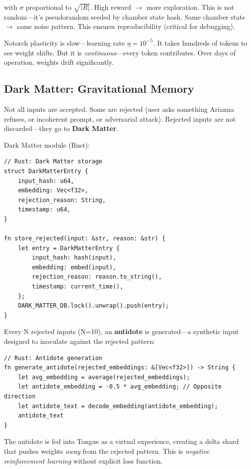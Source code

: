 \documentclass[11pt,a4paper]{article}
\begin{document}
with $\sigma$ proportional to $\sqrt{|R|}$. High reward $\to$ more exploration. This is not random—it's pseudorandom seeded by chamber state hash. Same chamber state $\to$ same noise pattern. This ensures reproducibility (critical for debugging).

Notorch plasticity is slow—learning rate $\eta = 10^{-5}$. It takes hundreds of tokens to see weight shifts. But it is \textit{continuous}—every token contributes. Over days of operation, weights drift significantly.

\subsection{Dark Matter: Gravitational Memory}

Not all inputs are accepted. Some are rejected (user asks something Arianna refuses, or incoherent prompt, or adversarial attack). Rejected inputs are not discarded—they go to \textbf{Dark Matter}.

Dark Matter module (Rust):

\begin{verbatim}
// Rust: Dark Matter storage
struct DarkMatterEntry {
    input_hash: u64,
    embedding: Vec<f32>,
    rejection_reason: String,
    timestamp: u64,
}

fn store_rejected(input: &str, reason: &str) {
    let entry = DarkMatterEntry {
        input_hash: hash(input),
        embedding: embed(input),
        rejection_reason: reason.to_string(),
        timestamp: current_time(),
    };
    DARK_MATTER_DB.lock().unwrap().push(entry);
}
\end{verbatim}

Every N rejected inputs (N=10), an \textbf{antidote} is generated—a synthetic input designed to inoculate against the rejected pattern:

\begin{verbatim}
// Rust: Antidote generation
fn generate_antidote(rejected_embeddings: &[Vec<f32>]) -> String {
    let avg_embedding = average(rejected_embeddings);
    let antidote_embedding = -0.5 * avg_embedding; // Opposite direction
    let antidote_text = decode_embedding(antidote_embedding);
    antidote_text
}
\end{verbatim}

The antidote is fed into Tongue as a virtual experience, creating a delta shard that pushes weights \textit{away} from the rejected pattern. This is \textit{negative reinforcement learning} without explicit loss function.
\end{document}
